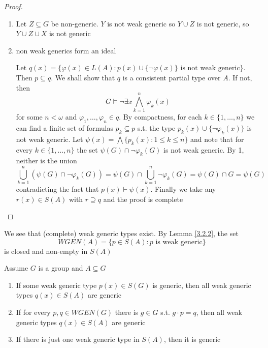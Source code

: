 \documentclass[11pt]{article}
\begin{document}
\begin{proof}
\begin{enumerate}
\item Let \(Z\subseteq G\)  be non-generic. \(Y\) is not weak generic so \(Y\cup Z\) is not generic,
so \(Y\cup Z\cup X\) is not generic
\item non weak generics form an ideal

Let \(q(x)=\{\varphi(x)\in L(A):p(x)\cup\{\neg\varphi(x)\}\text{ is not weak generic}\}\). Then \(p\subseteq q\). We shall
show that \(q\) is a consistent partial type over \(A\). If not, then
\begin{equation*}
G\vDash\neg\exists x\bigwedge_{k=1}^n\varphi_k(x)
\end{equation*}
for some \(n<\omega\) and \(\varphi_1,\dots,\varphi_n\in q\). By compactness, for each \(k\in\{1,\dots,n\}\) we can find a
finite set of formulas \(p_k\subseteq p\) s.t. the type \(p_k(x)\cup\{\neg\varphi_k(x)\}\) is not weak generic.
Let \(\psi(x)=\bigwedge\{p_k(x):1\le k\le n\}\) and note that for every \(k\in\{1,\dots,n\}\) the set \(\psi(G)\cap\neg\varphi_k(G)\)
is not weak generic. By 1, neither is the union
\begin{equation*}
\bigcup_{k=1}^n(\psi(G)\cap\neg\varphi_k(G))=\psi(G)\cap\bigcup_{k=1}^n\neg\varphi_k(G)=\psi(G)\cap G=\psi(G)
\end{equation*}
contradicting the fact that \(p(x)\vdash\psi(x)\). Finally we take any \(r(x)\in S(A)\)
with \(r\supseteq q\) and the proof is complete
\end{enumerate}
\end{proof}

We see that (complete) weak generic types exist. By Lemma \ref{3.2.2}, the set
\begin{equation*}
WGEN(A)=\{p\in S(A):p\text{ is weak generic}\}
\end{equation*}
is closed and non-empty in \(S(A)\)

\begin{lemma}[]
\label{3.2.3}
Assume \(G\) is a group and \(A\subseteq G\)
\begin{enumerate}
\item If some weak generic type \(p(x)\in S(G)\) is generic, then all weak generic
types \(q(x)\in S(A)\) are generic
\item If for every \(p,q\in WGEN(G)\) there is \(g\in G\) s.t. \(g\cdot p=q\), then all weak generic
types \(q(x)\in S(A)\) are generic
\item If there is just one weak generic type in \(S(A)\), then it is generic
\end{enumerate}
\end{lemma}
\end{document}
